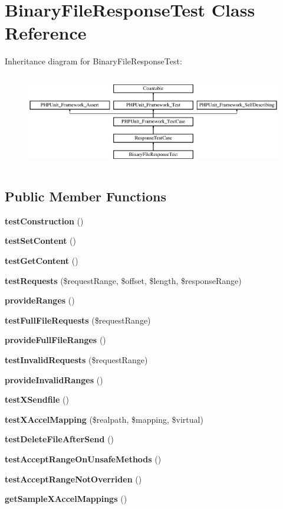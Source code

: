 \section{Binary\+File\+Response\+Test Class Reference}
\label{class_symfony_1_1_component_1_1_http_foundation_1_1_tests_1_1_binary_file_response_test}
Inheritance diagram for Binary\+File\+Response\+Test\+:\begin{figure}[H]
\begin{center}
\leavevmode
\includegraphics[height=4.129793cm]{class_symfony_1_1_component_1_1_http_foundation_1_1_tests_1_1_binary_file_response_test}
\end{center}
\end{figure}
\subsection*{Public Member Functions}
\begin{DoxyCompactItemize}
\item 
{\bf test\+Construction} ()
\item 
{\bf test\+Set\+Content} ()
\item 
{\bf test\+Get\+Content} ()
\item 
{\bf test\+Requests} (\$request\+Range, \$offset, \$length, \$response\+Range)
\item 
{\bf provide\+Ranges} ()
\item 
{\bf test\+Full\+File\+Requests} (\$request\+Range)
\item 
{\bf provide\+Full\+File\+Ranges} ()
\item 
{\bf test\+Invalid\+Requests} (\$request\+Range)
\item 
{\bf provide\+Invalid\+Ranges} ()
\item 
{\bf test\+X\+Sendfile} ()
\item 
{\bf test\+X\+Accel\+Mapping} (\$realpath, \$mapping, \$virtual)
\item 
{\bf test\+Delete\+File\+After\+Send} ()
\item 
{\bf test\+Accept\+Range\+On\+Unsafe\+Methods} ()
\item 
{\bf test\+Accept\+Range\+Not\+Overriden} ()
\item 
{\bf get\+Sample\+X\+Accel\+Mappings} ()
\end{DoxyCompactItemize}
